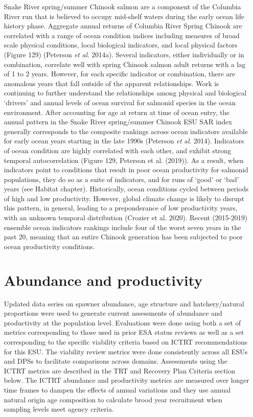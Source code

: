 \documentclass[
  letterpaper,
  oneside,
  open=any]{scrbook}
\begin{document}
Snake River spring/summer Chinook salmon are a component of the Columbia
River run that is believed to occupy mid-shelf waters during the early
ocean life history phase. Aggregate annual returns of Columbia River
Spring Chinook are correlated with a range of ocean condition indices
including measures of broad scale physical conditions, local biological
indicators, and local physical factors (Figure 129) (Peterson \emph{et
al.} 2014a). Several indicators, either individually or in combination,
correlate well with spring Chinook salmon adult returns with a lag of 1
to 2 years. However, for each specific indicator or combination, there
are anomalous years that fall outside of the apparent relationships.
Work is continuing to further understand the relationships among
physical and biological `drivers' and annual levels of ocean survival
for salmonid species in the ocean environment. After accounting for age
at return at time of ocean entry, the annual pattern in the Snake River
spring/summer Chinook ESU SAR index generally corresponds to the
composite rankings across ocean indicators available for early ocean
years starting in the late 1990s (Peterson \emph{et al}. 2014).
Indicators of ocean condition are highly correlated with each other, and
exhibit strong temporal autocorrelation (Figure 129, Peterson et al.
(2019)). As a result, when indicators point to conditions that result in
poor ocean productivity for salmonid populations, they do so as a suite
of indicators, and for runs of `good' or `bad' years (see Habitat
chapter). Historically, ocean conditions cycled between periods of high
and low productivity. However, global climate change is likely to
disrupt this pattern, in general, leading to a preponderance of low
productivity years, with an unknown temporal distribution (Crozier et
al. 2020). Recent (2015-2019) ensemble ocean indicators rankings include
four of the worst seven years in the past 20, meaning that an entire
Chinook generation has been subjected to poor ocean productivity
conditions.

\hypertarget{abundance-and-productivity-2}{%
\section{Abundance and
productivity}\label{abundance-and-productivity-2}}

Updated data series on spawner abundance, age structure and
hatchery/natural proportions were used to generate current assessments
of abundance and productivity at the population level. Evaluations were
done using both a set of metrics corresponding to those used in prior
ESA status reviews as well as a set corresponding to the specific
viability criteria based on ICTRT recommendations for this ESU. The
viability review metrics were done consistently across all ESUs and DPSs
to facilitate comparisons across domains. Assessments using the ICTRT
metrics are described in the TRT and Recovery Plan Criteria section
below. The ICTRT abundance and productivity metrics are measured over
longer time frames to dampen the effects of annual variations and they
use annual natural origin age composition to calculate brood year
recruitment when sampling levels meet agency criteria.
\end{document}
